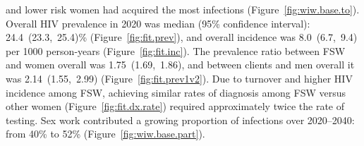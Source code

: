 and lower risk women had acquired the most infections (Figure~\ref{fig:wiw.base.to}). %
Overall HIV prevalence in 2020 was median (95\% confidence interval):
24.4~(23.3,~25.4)\% (Figure~\ref{fig:fit.prev}), %
and overall incidence was 8.0~(6.7,~9.4) per 1000 person-years (Figure~\ref{fig:fit.inc}).
The prevalence ratio between FSW and women overall was 1.75~(1.69,~1.86), %
and between clients and men overall it was 2.14~(1.55,~2.99) %
(Figure~\ref{fig:fit.prev1v2}).
Due to turnover and higher HIV incidence among FSW,
achieving similar rates of diagnosis among FSW versus other women (Figure~\ref{fig:fit.dx.rate})
required approximately twice the rate of testing. %
Sex work contributed a growing proportion of infections
over 2020--2040: from 40\% to 52\% (Figure~\ref{fig:wiw.base.part}). %
